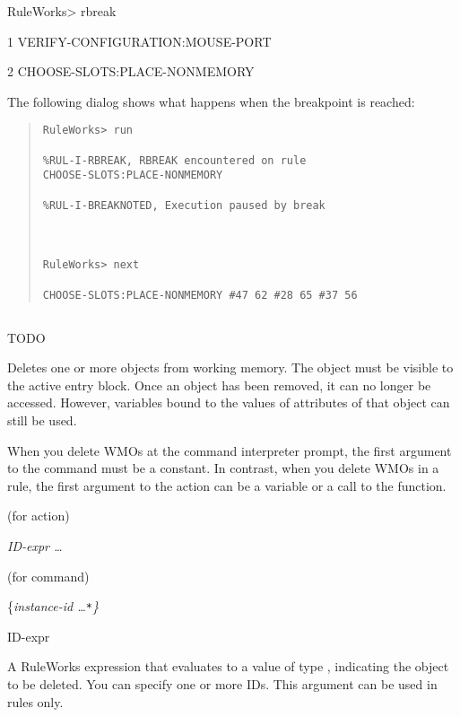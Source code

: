 {{RuleWorks> rbreak

1 VERIFY-CONFIGURATION:MOUSE-PORT

2 CHOOSE-SLOTS:PLACE-NONMEMORY

The following dialog shows what happens when the breakpoint
is reached:
\begin{quote}
\begin{verbatim}
RuleWorks> run

%RUL-I-RBREAK, RBREAK encountered on rule
CHOOSE-SLOTS:PLACE-NONMEMORY

%RUL-I-BREAKNOTED, Execution paused by break



RuleWorks> next

CHOOSE-SLOTS:PLACE-NONMEMORY #47 62 #28 65 #37 56
\end{verbatim}
\end{quote}

\subsection{}
TODO

Deletes one or more objects from working memory. The object must be
visible to the active entry block. Once an object has been removed, it
can no longer be accessed. However, variables bound to the values of
attributes of that object can still be used.

\begin{note}
  When you delete WMOs at the command interpreter prompt, the first
  argument to the  command must be a constant.  In contrast,
  when you delete WMOs in a rule, the first argument to the 
  action can be a variable or a call to the  function.
\end{note}

\Format (for action)

 \it{ID-expr} \ldots

\Format (for command)

 \{\it{instance-id} \ldots \verb|*|\}

\begin{arguments}

\item[ID-expr]

  A RuleWorks expression that evaluates to a value of type
  , indicating the object to be deleted. You can
  specify one or more IDs. This argument can be used in rules only.


\end{arguments}}}
